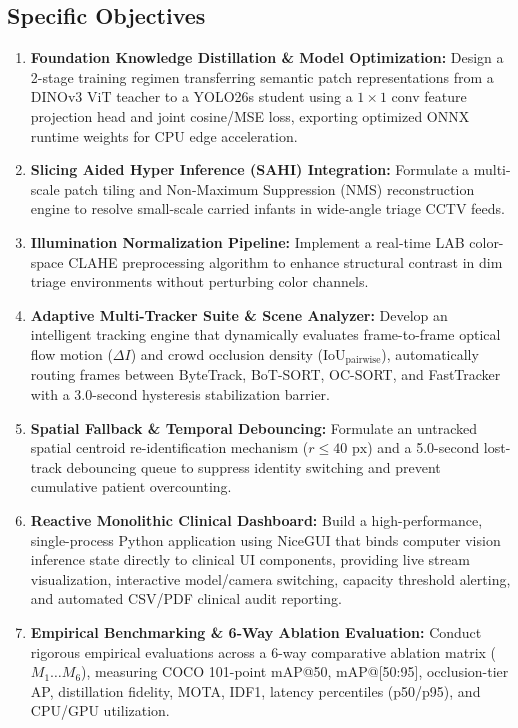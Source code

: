 \subsection{Specific Objectives}
\begin{enumerate}
    \item \textbf{Foundation Knowledge Distillation \& Model Optimization:} Design a 2-stage training regimen transferring semantic patch representations from a DINOv3 ViT teacher to a YOLO26s student using a $1\times 1$ conv feature projection head and joint cosine/MSE loss, exporting optimized ONNX runtime weights for CPU edge acceleration.
    \item \textbf{Slicing Aided Hyper Inference (SAHI) Integration:} Formulate a multi-scale patch tiling and Non-Maximum Suppression (NMS) reconstruction engine to resolve small-scale carried infants in wide-angle triage CCTV feeds.
    \item \textbf{Illumination Normalization Pipeline:} Implement a real-time LAB color-space CLAHE preprocessing algorithm to enhance structural contrast in dim triage environments without perturbing color channels.
    \item \textbf{Adaptive Multi-Tracker Suite \& Scene Analyzer:} Develop an intelligent tracking engine that dynamically evaluates frame-to-frame optical flow motion ($\Delta I$) and crowd occlusion density ($\text{IoU}_{\text{pairwise}}$), automatically routing frames between ByteTrack, BoT-SORT, OC-SORT, and FastTracker with a 3.0-second hysteresis stabilization barrier.
    \item \textbf{Spatial Fallback \& Temporal Debouncing:} Formulate an untracked spatial centroid re-identification mechanism ($r \le 40\text{ px}$) and a 5.0-second lost-track debouncing queue to suppress identity switching and prevent cumulative patient overcounting.
    \item \textbf{Reactive Monolithic Clinical Dashboard:} Build a high-performance, single-process Python application using NiceGUI that binds computer vision inference state directly to clinical UI components, providing live stream visualization, interactive model/camera switching, capacity threshold alerting, and automated CSV/PDF clinical audit reporting.
    \item \textbf{Empirical Benchmarking \& 6-Way Ablation Evaluation:} Conduct rigorous empirical evaluations across a 6-way comparative ablation matrix ($M_1 \dots M_6$), measuring COCO 101-point mAP@50, mAP@[50:95], occlusion-tier AP, distillation fidelity, MOTA, IDF1, latency percentiles (p50/p95), and CPU/GPU utilization.
\end{enumerate}


